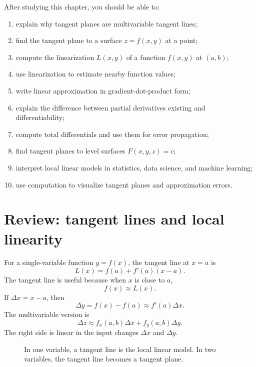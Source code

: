 \documentclass[11pt]{article}
\begin{document}
\begin{goalbox}
After studying this chapter, you should be able to:
\begin{enumerate}
  \item explain why tangent planes are multivariable tangent lines;
  \item find the tangent plane to a surface $z=f(x,y)$ at a point;
  \item compute the linearization $L(x,y)$ of a function $f(x,y)$ at $(a,b)$;
  \item use linearization to estimate nearby function values;
  \item write linear approximation in gradient-dot-product form;
  \item explain the difference between partial derivatives existing and differentiability;
  \item compute total differentials and use them for error propagation;
  \item find tangent planes to level surfaces $F(x,y,z)=c$;
  \item interpret local linear models in statistics, data science, and machine learning;
  \item use computation to visualize tangent planes and approximation errors.
\end{enumerate}
\end{goalbox}

\section{Review: tangent lines and local linearity}

For a single-variable function $y=f(x)$, the tangent line at $x=a$ is
\[
L(x)=f(a)+f'(a)(x-a).
\]
The tangent line is useful because when $x$ is close to $a$,
\[
f(x)\approx L(x).
\]
If $\Delta x=x-a$, then
\[
\Delta y=f(x)-f(a)\approx f'(a)\Delta x.
\]
The multivariable version is
\[
\Delta z\approx f_x(a,b)\Delta x+f_y(a,b)\Delta y.
\]
The right side is linear in the input changes $\Delta x$ and $\Delta y$.

\begin{figure}[H]
\centering
{}
\caption{In one variable, a tangent line is the local linear model. In two variables, the tangent line becomes a tangent plane.}
\end{figure}
\end{document}
